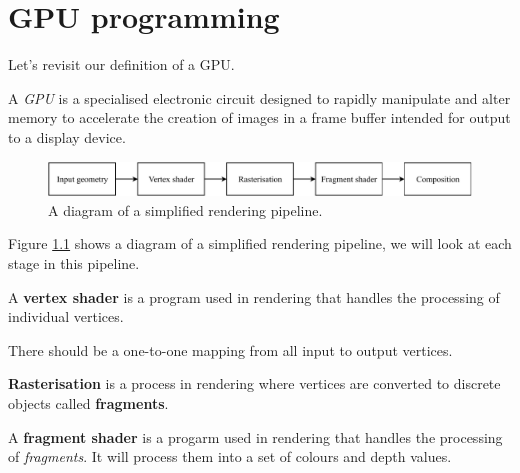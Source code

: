 \chapter{GPU programming}

Let's revisit our definition of a GPU.

\begin{definition}[GPU v2]
    A \emph{GPU} is a specialised electronic circuit designed to
    rapidly manipulate and alter memory to accelerate the creation of
    images in a frame buffer intended for output to a display device.
\end{definition}

\begin{figure}
    \centering
    \includegraphics[width=\linewidth]{images/rendering-pipeline.pdf}
    \caption{A diagram of a simplified rendering pipeline.}
    \label{fig:rendering-pipeline}
\end{figure}

Figure \ref{fig:rendering-pipeline} shows a diagram of a simplified rendering
pipeline, we will look at each stage in this pipeline.

\begin{definition}
    A \textbf{vertex shader} is a program used in rendering that handles the
    processing of individual vertices.
\end{definition}

There should be a one-to-one mapping from all input to output vertices.

\begin{definition}[Rasterisation]
    \textbf{Rasterisation} is a process in rendering where vertices are
    converted to discrete objects called \textbf{fragments}.
\end{definition}

\begin{definition}
    A \textbf{fragment shader} is a progarm used in rendering that
    handles the processing of \emph{fragments}.
    It will process them into a set of colours and depth values.
\end{definition}
